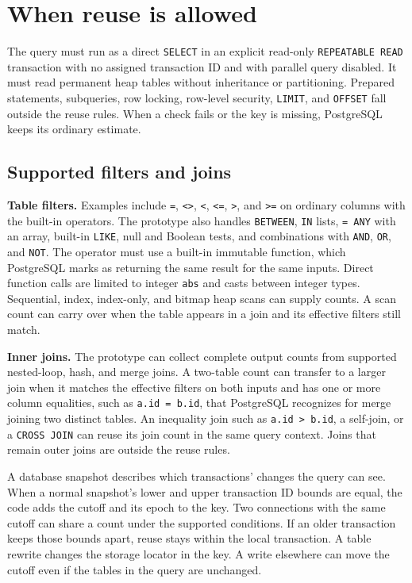 \documentclass[11pt,a4paper]{article}
\begin{document}
\newpage

\section*{When reuse is allowed}
The query must run as a direct \texttt{SELECT} in an explicit read-only
\texttt{REPEATABLE READ} transaction with no assigned transaction ID and with
parallel query disabled. It must read permanent heap tables without
inheritance or partitioning. Prepared statements, subqueries, row locking,
row-level security, \texttt{LIMIT}, and \texttt{OFFSET} fall outside the reuse
rules. When a check fails or the key is missing, PostgreSQL keeps its ordinary
estimate.

\subsection*{Supported filters and joins}
\textbf{Table filters.}
Examples include \texttt{=}, \texttt{<>}, \texttt{<}, \texttt{<=},
\texttt{>}, and \texttt{>=} on ordinary columns with the built-in operators.
The prototype also handles \texttt{BETWEEN}, \texttt{IN} lists,
\texttt{= ANY} with an array, built-in \texttt{LIKE}, null and Boolean tests,
and combinations with \texttt{AND}, \texttt{OR}, and \texttt{NOT}.
The operator must use a built-in immutable function, which PostgreSQL marks
as returning the same result for the same inputs. Direct function calls
are limited to integer \texttt{abs} and casts between integer types.
Sequential, index, index-only, and bitmap heap scans can supply counts.
A scan count can carry over when the table appears in a join and its
effective filters still match.

\textbf{Inner joins.}
The prototype can collect complete output counts from supported nested-loop,
hash, and merge joins. A two-table count can transfer to a larger join
when it matches the effective filters on both inputs and has one or more
column equalities, such as \texttt{a.id = b.id}, that PostgreSQL recognizes
for merge joining two distinct tables. An inequality join such as
\texttt{a.id > b.id}, a self-join, or a \texttt{CROSS JOIN} can reuse its
join count in the same query context. Joins that remain outer joins are
outside the reuse rules.

A database snapshot describes which transactions' changes the query can
see. When a normal snapshot's lower and upper transaction ID bounds are
equal, the code adds the cutoff and its epoch to the key. Two connections
with the same cutoff can share a count under the supported conditions.
If an older transaction keeps those bounds apart, reuse stays within the
local transaction. A table rewrite changes the storage locator in the
key. A write elsewhere can move the cutoff even if the tables in the query
are unchanged.
\end{document}
